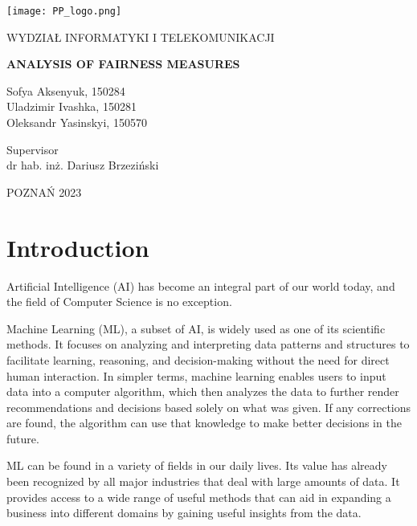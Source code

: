 \documentclass[a4paper, 12pt]{article}
\begin{document}
\begin{titlepage}
\hfill\texttt{[image: PP\_logo.png]}\hspace*{\fill}
\begin{flushright}
WYDZIAŁ INFORMATYKI I TELEKOMUNIKACJI
\end{flushright}
\vfill  
  
\begin{center}  
\Large \textbf{ANALYSIS OF
\bigbreak
FAIRNESS MEASURES
}
\end{center}

\vfill
\begin{center}
\large{
Sofya Aksenyuk, 150284\\
Uladzimir Ivashka, 150281\\
Oleksandr Yasinskyi, 150570}
\end{center}

\vfill
\begin{center}
\large{
Supervisor\\
dr hab. inż. Dariusz Brzeziński}
\end{center}

\vfill
\begin{center}
\large{
POZNAŃ 2023}
\end{center}

\end{titlepage}


{\large \tableofcontents}


\clearpage

\section{Introduction}
\large

Artificial Intelligence (AI) has become an integral part of our world today, and the field of Computer Science is no exception.

Machine Learning (ML), a subset of AI, is widely used as one of its scientific methods. It focuses on analyzing and interpreting data patterns and structures to facilitate learning, reasoning, and decision-making without the need for direct human interaction. In simpler terms, machine learning enables users to input data into a computer algorithm, which then analyzes the data to further render recommendations and decisions based solely on what was given. If any corrections are found, the algorithm can use that knowledge to make better decisions in the future.

ML can be found in a variety of fields in our daily lives. Its value has already been recognized by all major industries that deal with large amounts of data. It provides access to a wide range of useful methods that can aid in expanding a business into different domains by gaining useful insights from the data. 
\end{document}
